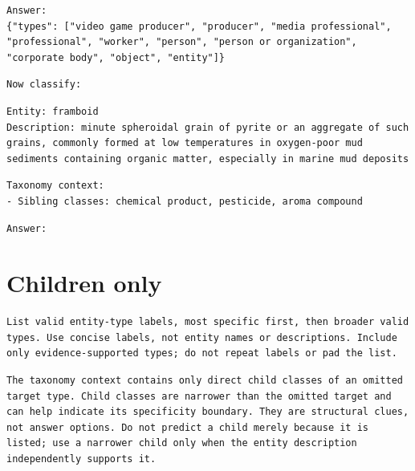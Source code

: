 \begin{Verbatim}[fontsize=\footnotesize,breaklines=true,breakanywhere=true]
Answer:
{"types": ["video game producer", "producer", "media professional", "professional", "worker", "person", "person or organization", "corporate body", "object", "entity"]}
\end{Verbatim}

\begin{Verbatim}[fontsize=\footnotesize,breaklines=true,breakanywhere=true]
Now classify:
\end{Verbatim}

\begin{Verbatim}[fontsize=\footnotesize,breaklines=true,breakanywhere=true]
Entity: framboid
Description: minute spheroidal grain of pyrite or an aggregate of such grains, commonly formed at low temperatures in oxygen-poor mud sediments containing organic matter, especially in marine mud deposits
\end{Verbatim}

\begin{Verbatim}[fontsize=\footnotesize,breaklines=true,breakanywhere=true]
Taxonomy context:
- Sibling classes: chemical product, pesticide, aroma compound
\end{Verbatim}

\begin{Verbatim}[fontsize=\footnotesize,breaklines=true,breakanywhere=true]
Answer:
\end{Verbatim}

\clearpage

\section{Children only}

\begin{Verbatim}[fontsize=\footnotesize,breaklines=true,breakanywhere=true]
List valid entity-type labels, most specific first, then broader valid types. Use concise labels, not entity names or descriptions. Include only evidence-supported types; do not repeat labels or pad the list.
\end{Verbatim}

\begin{Verbatim}[fontsize=\footnotesize,breaklines=true,breakanywhere=true]
The taxonomy context contains only direct child classes of an omitted target type. Child classes are narrower than the omitted target and can help indicate its specificity boundary. They are structural clues, not answer options. Do not predict a child merely because it is listed; use a narrower child only when the entity description independently supports it.
\end{Verbatim}

